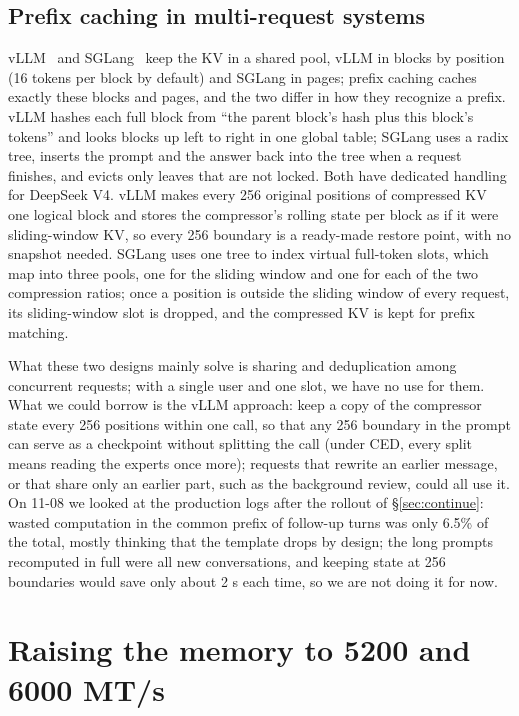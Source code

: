 \documentclass[11pt,a4paper]{article}
\begin{document}
\subsection{Prefix caching in multi-request systems}
\label{sec:prefixcache}

vLLM~\cite{vllm} and SGLang~\cite{sglang} keep the KV in a shared pool, vLLM in blocks by position (16 tokens per block by default) and SGLang in pages; prefix caching caches exactly these blocks and pages, and the two differ in how they recognize a prefix. vLLM hashes each full block from ``the parent block's hash plus this block's tokens'' and looks blocks up left to right in one global table; SGLang uses a radix tree, inserts the prompt and the answer back into the tree when a request finishes, and evicts only leaves that are not locked. Both have dedicated handling for DeepSeek V4. vLLM makes every 256 original positions of compressed KV one logical block and stores the compressor's rolling state per block as if it were sliding-window KV, so every 256 boundary is a ready-made restore point, with no snapshot needed. SGLang uses one tree to index virtual full-token slots, which map into three pools, one for the sliding window and one for each of the two compression ratios; once a position is outside the sliding window of every request, its sliding-window slot is dropped, and the compressed KV is kept for prefix matching.

What these two designs mainly solve is sharing and deduplication among concurrent requests; with a single user and one slot, we have no use for them. What we could borrow is the vLLM approach: keep a copy of the compressor state every 256 positions within one call, so that any 256 boundary in the prompt can serve as a checkpoint without splitting the call (under CED, every split means reading the experts once more); requests that rewrite an earlier message, or that share only an earlier part, such as the background review, could all use it. On 11-08 we looked at the production logs after the rollout of \S\ref{sec:continue}: wasted computation in the common prefix of follow-up turns was only 6.5\% of the total, mostly thinking that the template drops by design; the long prompts recomputed in full were all new conversations, and keeping state at 256 boundaries would save only about 2 s each time, so we are not doing it for now.

\section{Raising the memory to 5200 and 6000 MT/s}
\label{sec:ddr}
\end{document}
